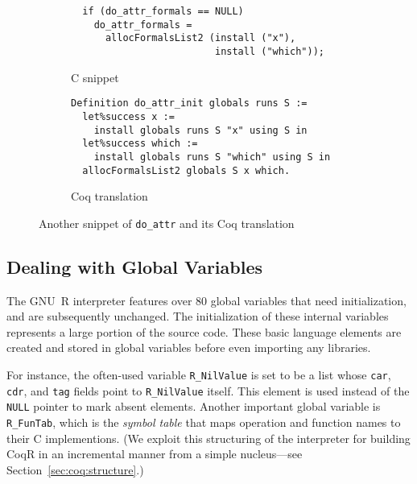 \documentclass[
    sigplan,
    10pt,
    review, %
    natbib=false %
 ]{acmart}
\newcommand\CoqR{CoqR}
\newcommand\newtext[1]{{\color{blue} #1}}
\begin{document}
%
%

\begin{figure*}
    \centering{}
\begin{subfigure}{.5\textwidth}
\begin{verbatim}
  if (do_attr_formals == NULL)
    do_attr_formals =
      allocFormalsList2 (install ("x"),
                         install ("which"));
\end{verbatim}
    \caption{C snippet}
    \label{fig:c:do_attr:formals}
\end{subfigure}
\begin{subfigure}{.49\textwidth}
\begin{verbatim}
Definition do_attr_init globals runs S :=
  let%success x :=
    install globals runs S "x" using S in
  let%success which :=
    install globals runs S "which" using S in
  allocFormalsList2 globals S x which.
\end{verbatim}
    \caption{Coq translation}
    \label{fig:coq:do_attr:formals}
\end{subfigure}
\vspace{-1em}
    \caption{Another snippet of \texttt{do_attr} and its Coq translation}
    \label{fig:do_attr:formals}
\end{figure*}

\subsection{Dealing with Global Variables}
\label{sec:globals}

The GNU~R interpreter features over \(80\) global variables that need initialization, and are subsequently unchanged.
The initialization of these internal variables
represents a large portion of the source code.
These basic language elements
are created and stored in global variables
before even importing any libraries.

For instance, the often-used variable \texttt{R_NilValue}
is set to be a list whose \texttt{car}, \texttt{cdr},
and \texttt{tag} fields point to \texttt{R_NilValue} itself.
This element is used instead of the \texttt{NULL} pointer
to mark absent elements. Another important global variable is
\texttt{R_FunTab}, which is the {\em symbol table} that maps operation and function names to their C implementions.
(We exploit this structuring of the interpreter for building \CoqR{} in an incremental manner
\newtext{from a simple nucleus}---see Section~\ref{sec:coq:structure}.)
\end{document}

